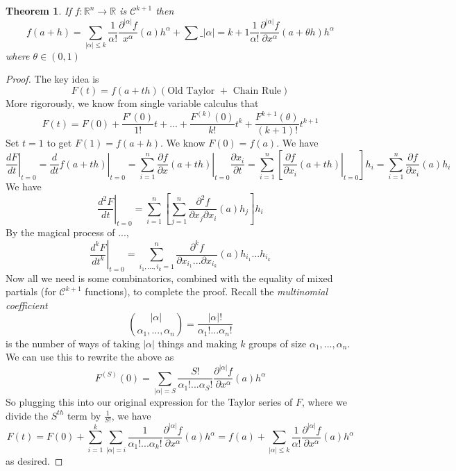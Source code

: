 \documentclass{article}
\newtheorem{theorem}{Theorem}
\newcommand{\reals}[0]{\mathbb{R}}
\newcommand{\mc}[1]{\mathcal{#1}}
\newcommand{\prt}[2]{\frac{\partial #1}{\partial #2}}
\begin{document}
\begin{theorem}
  If \(f: \reals^n \to \reals\) is \(\mc{C}^{k + 1}\) then
  \begin{equation}f(a + h) = \sum_{|\alpha| \leq k}\frac{1}{\alpha!}\frac{\partial^{|\alpha|}f}{x^\alpha}(a)h^\alpha + \sum\_{|\alpha| = k + 1}\frac{1}{\alpha!}\frac{\partial^{|\alpha|}f}{\partial x^\alpha}(a + \theta h)h^\alpha\end{equation}
  where \(\theta \in (0, 1)\)
\end{theorem}
\begin{proof}
  The key idea is
  \begin{equation}F(t) = f(a + th)(\text{Old Taylor } + \text{ Chain Rule})\end{equation}
  More rigorously, we know from single variable calculus that
  \begin{equation}F(t) = F(0) + \frac{F'(0)}{1!}t + ... + \frac{F^{(k)}(0)}{k!}t^k + \frac{F^{k + 1}(\theta)}{(k + 1)!}t^{k + 1}\end{equation}
  Set \(t = 1\) to get \(F(1) = f(a + h)\).
  We know \(F(0) = f(a)\). We have
  \begin{equation}\left.\frac{dF}{dt}\right|_{t = 0} = \left.\frac{d}{dt}f(a + th)\right|_{t = 0} = \sum_{i = 1}^n\left.\prt{f}{x}(a + th)\right|_{t = 0}\prt{x_i}{t} = \sum_{i = 1}^n\left[\left.\prt{f}{x_i}(a + th)\right|_{t = 0}\right]h_i
  = \sum_{i = 1}^n\prt{f}{x_i}(a)h_i\end{equation}
  We have
  \begin{equation}\left.\frac{d^2F}{dt}\right|_{t = 0} = \sum_{i = 1}^n\left[
    \sum_{j = 1}^n\frac{\partial^2f}{\partial x_j \partial x_i}(a)h_j
  \right]h_i\end{equation}
  By the magical process of ...,
  \begin{equation}\left.\frac{d^kF}{dt^k}\right|_{t = 0} = \sum_{i_1,...,i_k = 1}^n\frac{\partial^kf}{\partial x_{i_1} ... \partial x_{i_k}}(a)h_{i_1}...h_{i_k}\end{equation}
  Now all we need is some combinatorics, combined with the equality of mixed partials (for \(\mc{C}^{k + 1}\) functions), to complete the proof. Recall the \textit{multinomial coefficient}
  \begin{equation}{{|\alpha|} \choose {\alpha_1,...,\alpha_n}} = \frac{|\alpha|!}{\alpha_1!...\alpha_n!}\end{equation}
  is the number of ways of taking \(|\alpha|\) things and making \(k\) groups of size \(\alpha_1,...,\alpha_n\).
  We can use this to rewrite the above as
  \begin{equation}F^{(S)}(0) = \sum_{|\alpha| = S}\frac{S!}{\alpha_1!...\alpha_S!}\frac{\partial^{|\alpha|}f}{\partial x^\alpha}(a)h^\alpha\end{equation}
  So plugging this into our original expression for the Taylor series of \(F\), where we divide the \(S^{th}\) term by \(\frac{1}{S!}\), we have
  \begin{equation}F(t) = F(0) + \sum_{i = 1}^k\sum_{|\alpha| = i}\frac{1}{\alpha_1!...\alpha_k!}\frac{\partial^{|\alpha|}f}{\partial x^\alpha}(a)h^\alpha
  = f(a) + \sum_{|\alpha| \leq k}\frac{1}{\alpha!}\frac{\partial^{|\alpha|}f}{\partial x^\alpha}(a)h^\alpha\end{equation}
  as desired.


\end{proof}
\end{document}
